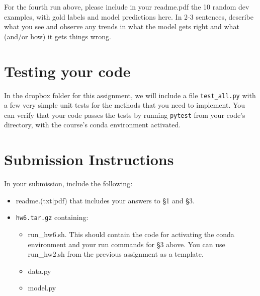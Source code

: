 \documentclass[11pt]{article}
\begin{document}
\vspace{2em}
 For the fourth run above, please include in your readme.pdf the 10 random dev examples, with gold labels and model predictions here.  In 2-3 sentences, describe what you see and observe any trends in what the model gets right and what (and/or how) it gets things wrong.


\section{Testing your code}

In the dropbox folder for this assignment, we will include a file \texttt{test\_all.py} with a few very simple unit tests for the methods that you need to implement.  You can verify that your code passes the tests by running \texttt{pytest} from your code's directory, with the course's conda environment activated.


\section*{Submission Instructions}

In your submission, include the following:
\begin{itemize}
  \item readme.(txt$\mid$pdf) that includes your answers to \S1 and \S3. 
  \item \texttt{hw6.tar.gz} containing:
  \begin{itemize}
    \item run\_hw6.sh.  This should contain the code for activating the conda environment and your run commands for \S3 above.  You can use run\_hw2.sh from the previous assignment as a template.
    \item data.py
    \item model.py
  \end{itemize}
\end{itemize}
\end{document}
